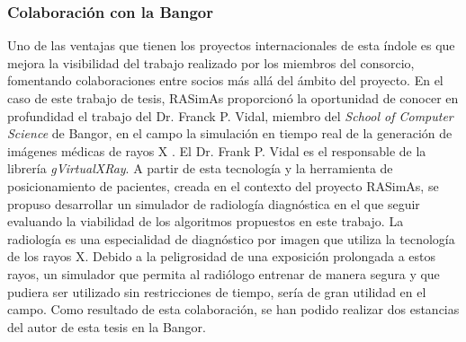 \subsubsection{Colaboración con la \acl{Bangor}}
%
Uno de las ventajas que tienen los proyectos internacionales de esta índole es que mejora la visibilidad del trabajo realizado por los miembros del consorcio, fomentando colaboraciones entre socios más allá del ámbito del proyecto.
%
En el caso de este trabajo de tesis, \ac{RASimAs} proporcionó la oportunidad de conocer en profundidad el trabajo del  Dr. Franck P. Vidal, miembro del  \emph{School of Computer Science} de \acl{Bangor}, en el campo la simulación en tiempo real de la generación de imágenes médicas de rayos X \cite{villard2014interventional}. El Dr. Frank P. Vidal es el responsable de la librería \emph{gVirtualXRay}\cite{sujar:hal}.
%
A partir de esta tecnología y la herramienta de posicionamiento de pacientes, creada en el contexto del proyecto \ac{RASimAs}, se propuso desarrollar un simulador de radiología diagnóstica en el que seguir evaluando la viabilidad de los algoritmos propuestos en este trabajo.
La radiología es una especialidad de diagnóstico por imagen que utiliza la tecnología de los rayos X. Debido a la peligrosidad de una exposición prolongada a estos rayos, un simulador que permita al radiólogo entrenar de manera segura y que pudiera ser utilizado sin restricciones de tiempo, sería de gran utilidad en el campo.
Como resultado de esta colaboración, se han podido realizar dos estancias del autor de esta tesis en la \acl{Bangor}. 






